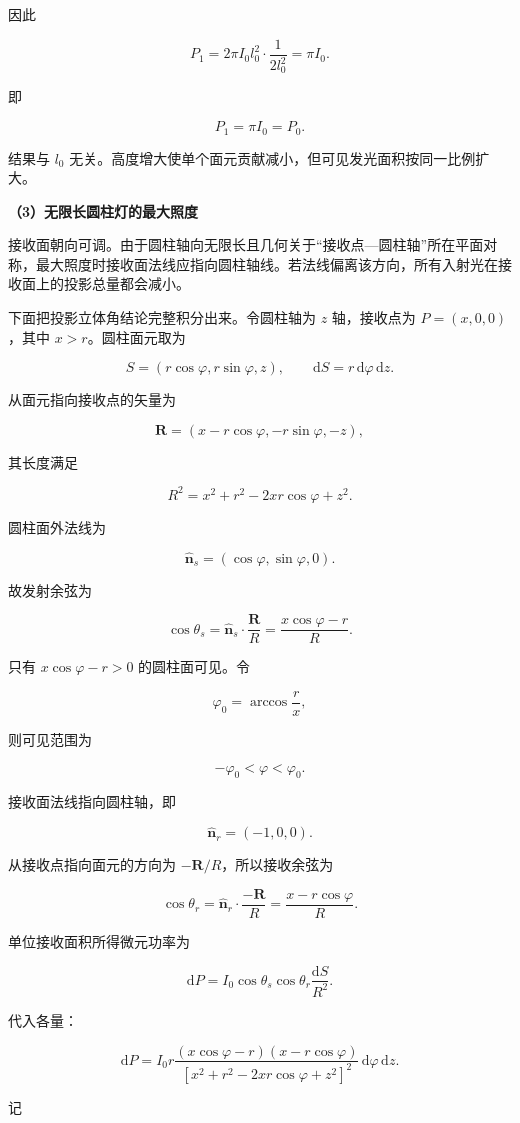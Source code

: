 \documentclass[12pt,a4paper,UTF8]{ctexart}
\begin{document}
因此

\[
P_1=2\pi I_0l_0^2\cdot\frac1{2l_0^2}
=\pi I_0.
\]

即

\[\boxed{P_1=\pi I_0=P_0}.\]

结果与 \(l_0\)
无关。高度增大使单个面元贡献减小，但可见发光面积按同一比例扩大。

\textbf{（3）无限长圆柱灯的最大照度}

接收面朝向可调。由于圆柱轴向无限长且几何关于``接收点---圆柱轴''所在平面对称，最大照度时接收面法线应指向圆柱轴线。若法线偏离该方向，所有入射光在接收面上的投影总量都会减小。

下面把投影立体角结论完整积分出来。令圆柱轴为 \(z\) 轴，接收点为
\(P=(x,0,0)\)，其中 \(x>r\)。圆柱面元取为

\[
S=(r\cos\varphi,r\sin\varphi,z),
\qquad
\mathrm{d}S=r\,\mathrm{d}\varphi\,\mathrm{d}z.
\]

从面元指向接收点的矢量为

\[
\bm R=(x-r\cos\varphi,-r\sin\varphi,-z),
\]

其长度满足

\[
R^2=x^2+r^2-2xr\cos\varphi+z^2.
\]

圆柱面外法线为

\[\hat{\bm n}_s=(\cos\varphi,\sin\varphi,0).\]

故发射余弦为

\[
\cos\theta_s
=\hat{\bm n}_s\cdot\frac{\bm R}{R}
=\frac{x\cos\varphi-r}{R}.
\]

只有 \(x\cos\varphi-r>0\) 的圆柱面可见。令

\[\varphi_0=\arccos\frac rx,\]

则可见范围为

\[-\varphi_0<\varphi<\varphi_0.\]

接收面法线指向圆柱轴，即

\[\hat{\bm n}_r=(-1,0,0).\]

从接收点指向面元的方向为 \(-\bm R/R\)，所以接收余弦为

\[
\cos\theta_r
=\hat{\bm n}_r\cdot\frac{-\bm R}{R}
=\frac{x-r\cos\varphi}{R}.
\]

单位接收面积所得微元功率为

\[
\mathrm{d}P=I_0\cos\theta_s\cos\theta_r
\frac{\mathrm{d}S}{R^2}.
\]

代入各量：

\[
\mathrm{d}P=I_0r
\frac{(x\cos\varphi-r)(x-r\cos\varphi)}
{[x^2+r^2-2xr\cos\varphi+z^2]^2}
\,\mathrm{d}\varphi\,\mathrm{d}z.
\]

记
\end{document}
